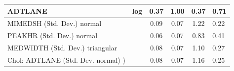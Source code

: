\begin{table}
\begin{center}
\begin{tabular}{|l|l|c|c|c|l|}
			\hline
			ADTLANE & log & 0.37 & 1.00 & 0.37 & 0.71 \\
			\hline
			MIMEDSH (Std. Dev.) normal &  & 0.09 & 0.07 & 1.22 & 0.22 \\
			\hline
			PEAKHR (Std. Dev.) normal &  & 0.06 & 0.07 & 0.83 & 0.41 \\
			\hline
			MEDWIDTH (Std. Dev.) triangular &  & 0.08 & 0.07 & 1.10 & 0.27 \\
			\hline
			 Chol: ADTLANE (Std. Dev. normal) ) &  & 0.08 & 0.07 & 1.16 & 0.25 \\
			\hline
		\end{tabular}
	\end{center}
\end{table}